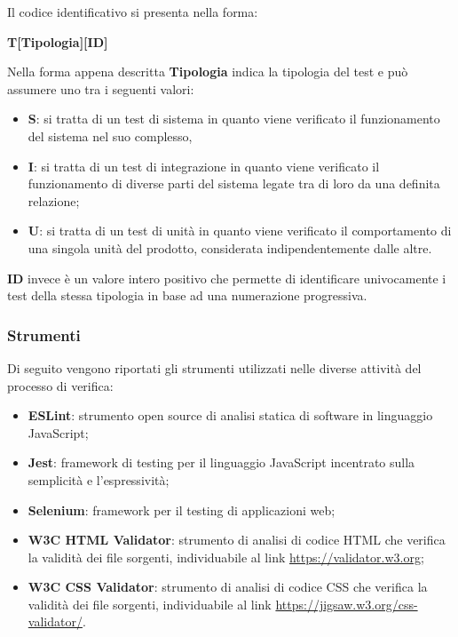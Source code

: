 Il codice identificativo si presenta nella forma:
\begin{center}
    \textbf{T[Tipologia][ID]}
\end{center}
Nella forma appena descritta \textbf{Tipologia} indica la tipologia del test e può assumere uno tra i seguenti valori:
\begin{itemize}
	\item \textbf{S}: si tratta di un test di sistema in quanto viene verificato il funzionamento del sistema nel suo complesso,
	\item \textbf{I}: si tratta di un test di integrazione in quanto viene verificato il funzionamento di diverse parti del sistema legate
		tra di loro da una definita relazione;
	\item \textbf{U}: si tratta di un test di unità in quanto viene verificato il comportamento di una singola unità del prodotto,
		considerata indipendentemente dalle altre.
\end{itemize}

\textbf{ID} invece è un valore intero positivo che permette di identificare univocamente i test della stessa tipologia in base ad una
numerazione progressiva.



\subsubsection{Strumenti}
\label{ssub:verifica:strumenti}

Di seguito vengono riportati gli strumenti utilizzati nelle diverse attività del processo di verifica:
\begin{itemize}
	\item \textbf{ESLint}: strumento open source di analisi statica di software in linguaggio JavaScript;
	\item \textbf{Jest}: framework di testing per il linguaggio JavaScript incentrato sulla semplicità e l'espressività;
	\item \textbf{Selenium}: framework per il testing di applicazioni web;
	\item \textbf{W3C HTML Validator}: strumento di analisi di codice HTML che verifica la validità dei file sorgenti, individuabile al
		link \url{https://validator.w3.org};
	\item \textbf{W3C CSS Validator}: strumento di analisi di codice CSS che verifica la validità dei file sorgenti, individuabile al
		link \url{https://jigsaw.w3.org/css-validator/}.
\end{itemize}

